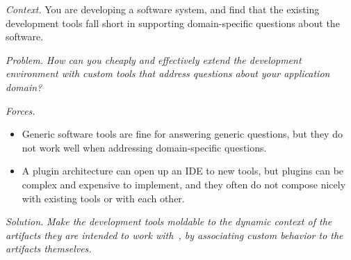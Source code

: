\documentclass[acmsmall,screen,authorversion,nonacm]{acmart} %
\newcommand\tk[1]{\nbc{Timo}{#1}{cyan}}
\newcommand\kh[1]{\nbc{Konrad}{#1}{violet}}
\newcommand\cp[1]{\nbe{Cesare}{#1}{olive}} %
\newcommand\dd[1]{\nbe{Daniel}{#1}{magenta}} %
\newcommand\ws[1]{\nbe{Workshop}{#1}{teal}} %
\newcommand{\patsec}[1]{\noindent\textit{#1.}\xspace}
\begin{document}

\patsec{Context}
You are developing a software system, and find that the existing development tools fall short in supporting
domain-specific questions about the software.

\patsec{Problem}
\emph{How can you cheaply and effectively extend the development environment with custom tools that address questions about your application domain?}

\patsec{Forces}
\begin{itemize}[---]
\item Generic software tools are fine for answering generic questions, but they do not work well when addressing domain-specific questions.
\item A plugin architecture can open up an IDE to new tools, but plugins can be complex and expensive to implement, 
and they often do not compose nicely with existing tools or with each other.
\end{itemize}


\patsec{Solution}
\emph{Make the development tools \emph{moldable} to the \emph{dynamic context} of the artifacts they are intended to work with~\cite{Chis17a}, by associating custom behavior to the artifacts themselves.}
\end{document}

